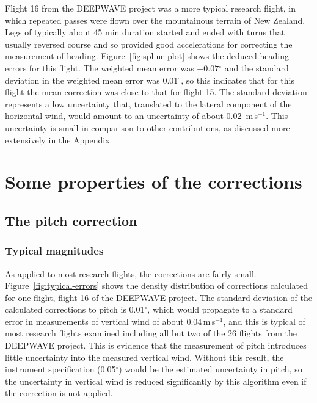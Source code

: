 \documentclass[english,british,amtd,bookmarks=false,unicode=true]{copernicus}\usepackage[]{graphicx}\usepackage[]{color}
\begin{document}
Flight 16 from the DEEPWAVE project was a more typical research flight,
in which repeated passes were flown over the mountainous terrain of
New Zealand. Legs of typically about 45 min duration started and ended
with turns that usually reversed course and so provided good accelerations
for correcting the measurement of heading. Figure~\ref{fig:spline-plot}
shows the deduced heading errors for this flight. The weighted mean
error was \ensuremath{-0.07}$^{\circ}$ and the standard deviation
in the weighted mean error was 0.01$^{\circ}$,
so this indicates that for this flight the mean correction was close
to that for flight 15. The standard deviation represents a low uncertainty
that, translated to the lateral component of the horizontal wind,
would amount to an uncertainty of about 0.02~m\,s$^{-1}$.
This uncertainty is small in comparison to other contributions, as
discussed more extensively in the Appendix. 


\section{Some properties of the corrections}


\subsection{The pitch correction}


\subsubsection{Typical magnitudes}



As applied to most research flights, the corrections are fairly small.
Figure~\ref{fig:typical-errors} shows the density distribution of
corrections calculated for one flight, flight 16 of the DEEPWAVE project.
The standard deviation of the calculated corrections to pitch is 0.01$^{\circ}$,
which would propagate to a standard error in measurements of vertical
wind of about 0.04\,m\,s$^{-1}$,
and this is typical of most research flights examined including all
but two of the 26 flights from the DEEPWAVE project. This is evidence
that the measurement of pitch introduces little uncertainty into the
measured vertical wind. Without this result, the instrument specification
(0.05$^{\circ}$) would be the estimated uncertainty in pitch, so
the uncertainty in vertical wind is reduced significantly by this
algorithm even if the correction is not applied. 
\end{document}

